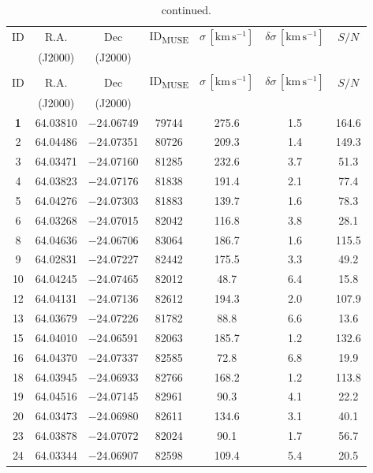 \documentclass{aa}
\begin{document}
\begin{appendix}
\begin{longtable}{c c c c c c c}
\caption{\label{tab:table0416} Velocity dispersion catalogue for M0416.}\\
\hline\hline
ID & R.A. & Dec & ID\textsubscript{MUSE} & $\sigma \, [\mathrm{km \, s^{-1}}]$ & $\delta \sigma \, [\mathrm{km \, s^{-1}}]$ & $S/N$ \\  & (J2000) & (J2000) & & & & \\
\hline
\endfirsthead
\caption{continued.}\\
\hline\hline
ID & R.A. & Dec & ID\textsubscript{MUSE} & $\sigma \, [\mathrm{km \, s^{-1}}]$ & $\delta \sigma \, [\mathrm{km \, s^{-1}}]$ & $S/N$ \\  & (J2000) & (J2000) & & & & \\
\hline
\endhead
\hline
\endfoot
%
\textbf{1} & 64.03810 & $-$24.06749 & 79744 & 275.6 & 1.5 & 164.6 \\
2 & 64.04486 & $-$24.07351 & 80726 & 209.3 & 1.4 & 149.3 \\
3 & 64.03471 & $-$24.07160 & 81285 & 232.6 & 3.7 & 51.3 \\
4 & 64.03823 & $-$24.07176 & 81838 & 191.4 & 2.1 & 77.4 \\
5 & 64.04276 & $-$24.07303 & 81883 & 139.7 & 1.6 & 78.3 \\
6 & 64.03268 & $-$24.07015 & 82042 & 116.8 & 3.8 & 28.1 \\
8 & 64.04636 & $-$24.06706 & 83064 & 186.7 & 1.6 & 115.5 \\
9 & 64.02831 & $-$24.07227 & 82442 & 175.5 & 3.3 & 49.2 \\
10 & 64.04245 & $-$24.07465 & 82012 & 48.7 & 6.4 & 15.8 \\
12 & 64.04131 & $-$24.07136 & 82612 & 194.3 & 2.0 & 107.9 \\
13 & 64.03679 & $-$24.07226 & 81782 & 88.8 & 6.6 & 13.6 \\
15 & 64.04010 & $-$24.06591 & 82063 & 185.7 & 1.2 & 132.6 \\
16 & 64.04370 & $-$24.07337 & 82585 & 72.8 & 6.8 & 19.9 \\
18 & 64.03945 & $-$24.06933 & 82766 & 168.2 & 1.2 & 113.8 \\
19 & 64.04516 & $-$24.07145 & 82961 & 90.3 & 4.1 & 22.2 \\
20 & 64.03473 & $-$24.06980 & 82611 & 134.6 & 3.1 & 40.1 \\
23 & 64.03878 & $-$24.07072 & 82024 & 90.1 & 1.7 & 56.7 \\
24 & 64.03344 & $-$24.06907 & 82598 & 109.4 & 5.4 & 20.5 \\

\end{longtable}
\end{appendix}
\end{document}
